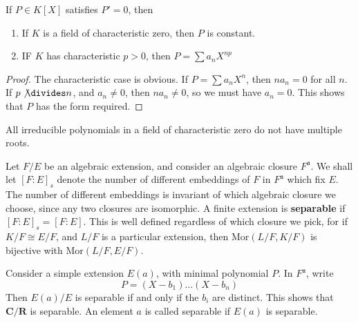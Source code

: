 \begin{theorem}
    If $P \in K[X]$ satisfies $P' = 0$, then
    \begin{enumerate}
        \item If $K$ is a field of characteristic zero, then $P$ is constant.
        \item IF $K$ has characteristic $p > 0$, then $P = \sum a_n X^{np}$
    \end{enumerate}
\end{theorem}
\begin{proof}
    The characteristic case is obvious. If $P = \sum a_n X^n$, then $n a_n = 0$ for all $n$. If $p \not \divides n$, and $a_n \neq 0$, then $n a_n \neq 0$, so we must have $a_n = 0$. This shows that $P$ has the form required.
\end{proof}

\begin{corollary}
    All irreducible polynomials in a field of characteristic zero do not have multiple roots.
\end{corollary}

Let $F/E$ be an algebraic extension, and consider an algebraic closure $F^{\mathfrak{a}}$. We shall let $[F:E]_s$ denote the number of different embeddings of $F$ in $F^{\mathfrak{a}}$ which fix $E$. The number of different embeddings is invariant of which algebraic closure we choose, since any two closures are isomorphic. A finite extension is {\bf separable} if $[F:E]_s = [F:E]$. This is well defined regardless of which closure we pick, for if $K/F \cong E/F$, and $L/F$ is a particular extension, then $\text{Mor}(L/F,K/F)$ is bijective with $\text{Mor}(L/F,E/F)$.

\begin{example}
    Consider a simple extension $E(a)$, with minimal polynomial $P$. In $F^{\mathfrak{a}}$, write
    \[ P = (X - b_1) \dots (X - b_n) \]
    Then $E(a)/E$ is separable if and only if the $b_i$ are distinct. This shows that $\mathbf{C}/\mathbf{R}$ is separable. An element $a$ is called separable if $E(a)$ is separable.
\end{example}

